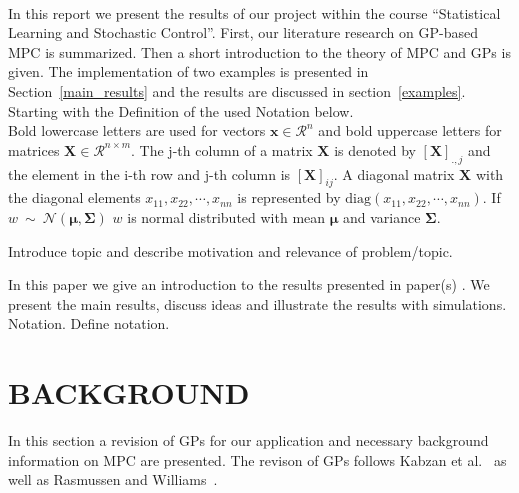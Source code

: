 \documentclass[letterpaper, 10 pt, conference]{ieeeconf}  %
\begin{document}
 \\
In this report we present the results of our project within the course ``Statistical Learning and Stochastic Control''. First, our literature research on GP-based MPC is summarized. Then a short introduction to the theory of MPC and GPs is given. The implementation of two examples is presented in Section~\ref{main_results} and the results are discussed in section~\ref{examples}.\\
Starting with the Definition of the used Notation below.\\
Bold lowercase letters are used for vectors $\boldsymbol{x} \in \mathcal{R}^n$ and bold uppercase letters for matrices $\boldsymbol{X} \in \mathcal{R}^{n \times m}$. The j-th column of a matrix $\boldsymbol{X}$ is denoted by $[\boldsymbol{X}]_{.,j}$ and the element in the i-th row and j-th column is $[\boldsymbol{X}]_{ij}$. A diagonal matrix $\boldsymbol{X}$ with the diagonal elements $x_{11}, x_{22}, \cdots, x_{nn}$ is represented by $\text{diag}(x_{11}, x_{22}, \cdots, x_{nn})$. If ${w}~\sim~\mathcal{N}(\boldsymbol{\mu},\boldsymbol{\Sigma})$ $w$ is normal distributed with mean $\boldsymbol{\mu}$ and variance $\boldsymbol{\Sigma}$.

Introduce topic and describe motivation and relevance of problem/topic.

In this paper we give an introduction to the results presented in paper(s) \cite{Bro-14}.
We present the main results, discuss ideas and illustrate the results with simulations.\\

Notation. Define notation.

\section{BACKGROUND}
In this section a revision of GPs for our application and necessary background information on MPC are presented. The revison of GPs follows Kabzan et al.~\cite{kabzan2019learning} as well as Rasmussen and Williams~\cite{williams2006gaussian}. \\
\end{document}
